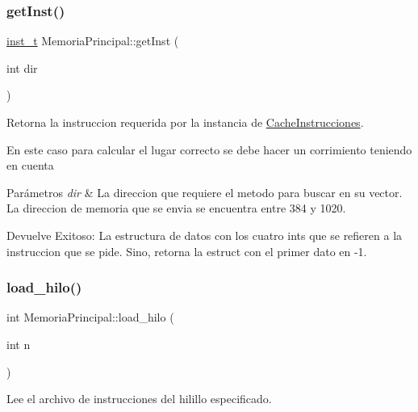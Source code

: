 \subsubsection{\texorpdfstring{get\+Inst()}{getInst()}}
{\footnotesize\ttfamily \hyperlink{structinst__t}{inst\+\_\+t} Memoria\+Principal\+::get\+Inst (\begin{DoxyParamCaption}\item[{int}]{dir }\end{DoxyParamCaption})}



Retorna la instruccion requerida por la instancia de \hyperlink{classCacheInstrucciones}{Cache\+Instrucciones}. 

En este caso para calcular el lugar correcto se debe hacer un corrimiento teniendo en cuenta 
\begin{DoxyParams}{Parámetros}
{\em dir} & La direccion que requiere el metodo para buscar en su vector. La direccion de memoria que se envia se encuentra entre 384 y 1020. \\
\hline
\end{DoxyParams}
\begin{DoxyReturn}{Devuelve}
Exitoso\+: La estructura de datos con los cuatro ints que se refieren a la instruccion que se pide. Sino, retorna la estruct con el primer dato en -\/1. 
\end{DoxyReturn}
\mbox{\label{classMemoriaPrincipal_a5262cc20950dd1b8fafd3d0dae36237f}} 
\subsubsection{\texorpdfstring{load\+\_\+hilo()}{load\_hilo()}}
{\footnotesize\ttfamily int Memoria\+Principal\+::load\+\_\+hilo (\begin{DoxyParamCaption}\item[{int}]{n }\end{DoxyParamCaption})}



Lee el archivo de instrucciones del hilillo especificado. 

